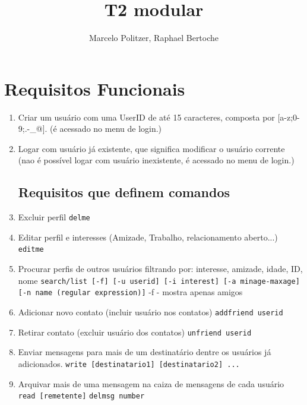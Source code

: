 \documentclass[a4paper,12pt]{article}
\title{T2 modular}
\author{Marcelo Politzer, Raphael Bertoche}
\begin{document}
\maketitle

\section{Requisitos Funcionais}


\begin{enumerate}
\item Criar um usuário com uma UserID de até 15 caracteres, composta por
[a-z;0-9;.-\_@]. (é acessado no menu de login.)

\item Logar com usuário já existente, que significa modificar o usuário
 corrente (nao é possível logar com usuário inexistente, é acessado no menu
 de login.)

\subsection{Requisitos que definem comandos}
\item Excluir perfil
 \newline\texttt{delme}

\item Editar perfil e interesses (Amizade, Trabalho, relacionamento aberto...)
\newline\texttt{editme}

\item Procurar perfis de outros usuários filtrando por: interesse, amizade,
 idade, ID, nome
 \newline\texttt{search/list [-f] [-u userid] [-i interest] [-a minage-maxage]
 [-n name (regular expression)]}
 \newline-f - mostra apenas amigos

\item Adicionar novo contato (incluir usuário nos contatos)
 \newline\texttt{addfriend userid}

\item Retirar contato (excluir usuário dos contatos)
 \newline\texttt{unfriend userid}

\item Enviar mensagens para mais de um destinatário dentre os usuários já
 adicionados.
 \newline\texttt{write [destinatario1] [destinatario2] ...}

\item Arquivar mais de uma mensagem na caiza de mensagens de cada usuário
 \newline\texttt{read [remetente]}
 \newline\texttt{delmsg number}

\end{enumerate}
\end{document}
